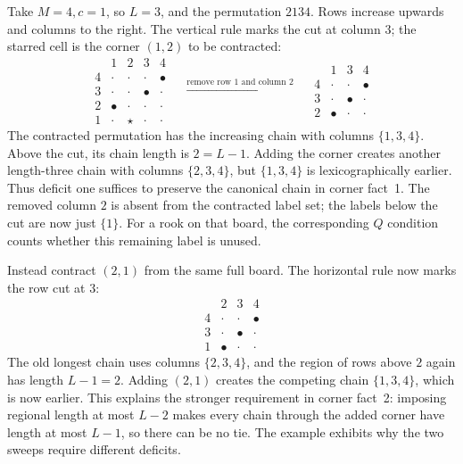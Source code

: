 \begin{example}\label{tx:eg:corner-contractions}
Take $M=4,c=1$, so $L=3$, and the permutation $2134$. Rows increase upwards and columns to the right. The vertical rule marks the cut at column $3$; the starred cell is the corner $(1,2)$ to be contracted:
\[
\begin{array}{c|cc|cc}
 &1&2&3&4\\\hline
4&\cdot&\cdot&\cdot&\bullet\\
3&\cdot&\cdot&\bullet&\cdot\\
2&\bullet&\cdot&\cdot&\cdot\\\hline
1&\cdot&\star&\cdot&\cdot
\end{array}
\quad\xrightarrow{\text{remove row }1\text{ and column }2}\quad
\begin{array}{c|c|cc}
 &1&3&4\\\hline
4&\cdot&\cdot&\bullet\\
3&\cdot&\bullet&\cdot\\
2&\bullet&\cdot&\cdot
\end{array}
\]
The contracted permutation has the increasing chain with columns $\{1,3,4\}$. Above the cut, its chain length is $2=L-1$. Adding the corner creates another length-three chain with columns $\{2,3,4\}$, but $\{1,3,4\}$ is lexicographically earlier. Thus deficit one suffices to preserve the canonical chain in corner fact~1. The removed column $2$ is absent from the contracted label set; the labels below the cut are now just $\{1\}$. For a rook on that board, the corresponding $Q$ condition counts whether this remaining label is unused.

Instead contract $(2,1)$ from the same full board. The horizontal rule now marks the row cut at $3$:
\[
\begin{array}{c|ccc}
 &2&3&4\\\hline
4&\cdot&\cdot&\bullet\\
3&\cdot&\bullet&\cdot\\\hline
1&\bullet&\cdot&\cdot
\end{array}
\]
The old longest chain uses columns $\{2,3,4\}$, and the region of rows above $2$ again has length $L-1=2$. Adding $(2,1)$ creates the competing chain $\{1,3,4\}$, which is now earlier. This explains the stronger requirement in corner fact~2: imposing regional length at most $L-2$ makes every chain through the added corner have length at most $L-1$, so there can be no tie. The example exhibits why the two sweeps require different deficits.
\end{example}

